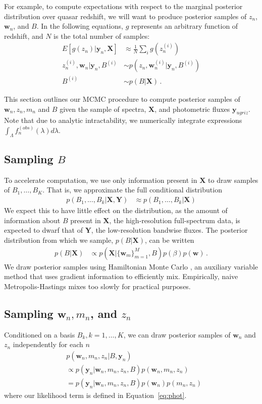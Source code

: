 \documentclass{article}
\begin{document}
For example, to compute expectations with respect to the marginal posterior distribution over quasar redshift, we will want to produce posterior samples of $z_n$, $\mathbf{w}_n$, and $B$. In the following
equations, $g$ represents an arbitrary function of redshift, and $N$ is the total number of samples:
\begin{align}
  E[ g(z_n) | \mathbf{y}_n, \mathbf{X} ] 
    &\approx \frac{1}{N} \sum_{i} g(z_n^{(i)}) \\
    z_n^{(i)}, \mathbf{w}_n | \mathbf{y}_n, B^{(i)} &\sim p(z_n, \mathbf{w}_n^{(i)} | \mathbf{y}_n, B^{(i)}) \\
    B^{(i)} &\sim p(B | \mathbf{X}) \, .
\end{align}

This section outlines our MCMC procedure to compute posterior samples of $\mathbf{w}_n, z_n, m_n$ and $B$ given the sample of spectra, $\mathbf{X}$, and photometric fluxes $\mathbf{y}_{ugriz}$.  Note that due to analytic intractability, we numerically integrate expressions $\int_\Lambda f_n^{(obs)}(\lambda) d\lambda$. 

\subsection{Sampling $B$}
To accelerate computation, we use only information present in $\mathbf{X}$ to draw samples of $B_1, \dots, B_K$.  That is, we approximate the full conditional distribution 
\begin{align}
  p(B_1,\dots, B_k | \mathbf{X}, \mathbf{Y}) 
    &\approx p(B_1, \dots, B_k | \mathbf{X})
\end{align}
We expect this to have little effect on the distribution, as the amount of information about $B$ present in $\mathbf{X}$, the high-resolution full-spectrum data, is expected to dwarf that of $\mathbf{Y}$, the
low-resolution bandwise fluxes.  The posterior distribution from which we sample, $p(B | \mathbf{X})$, can be written 
\begin{align}
  p(B | \mathbf{X}) 
    &\propto p(\mathbf{X} | \{ \mathbf{w}_m\}_{m=1}^M, B) p(\beta) p(\mathbf{w}) \, .
\end{align}
We draw posterior samples using Hamiltonian Monte Carlo \cite{neal2011mcmc}, an auxiliary variable method that uses gradient information to efficiently mix.  Empirically, naive Metropolis-Hastings mixes too slowly for practical purposes. 

\subsection{Sampling $\mathbf{w}_n, m_n$, and $z_n$}
Conditioned on a basis $B_k, k=1,\dots, K$, we can draw posterior samples of $\mathbf{w}_n$ and $z_n$ independently for each $n$
\begin{align}
  &p(\mathbf{w}_n, m_n, z_n | B, \mathbf{y}_n) \\
  &\propto p(\mathbf{y}_n | \mathbf{w}_n, m_n, z_n, B) p(\mathbf{w}_n, m_n, z_n) \\
  &= p(\mathbf{y}_n | \mathbf{w}_n, m_n, z_n, B) p(\mathbf{w}_n) p(m_n, z_n)
\end{align}
where our likelihood term is defined in Equation~\ref{eq:phot}. 
\end{document}

